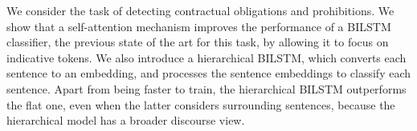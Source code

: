 We consider the task of detecting contractual obligations and prohibitions. We show that a self-attention mechanism improves the performance of a BILSTM classifier, the previous state of the  art for this task, by allowing it to focus on indicative tokens. We also introduce a hierarchical BILSTM, which converts each sentence to an embedding, and processes the sentence embeddings to classify each sentence. Apart from being faster to train, the hierarchical BILSTM outperforms the flat one, even when the latter considers surrounding sentences, because the hierarchical model has a broader discourse view.
